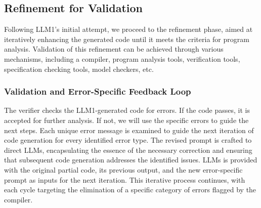 
\subsection{Refinement for Validation}

% 


Following LLM1's initial attempt, we proceed to the refinement phase, aimed at iteratively enhancing the generated code until it meets the criteria for program analysis. Validation of this refinement can be achieved through various mechanisms, including a compiler, program analysis tools, verification tools, specification checking tools, model checkers, etc.


\subsubsection{Validation and Error-Specific Feedback Loop}

The verifier checks the LLM1-generated code for errors. If the code passes, it is accepted for further analysis. If not, we will use the specific errors to guide the next steps.
%
Each unique error message is examined to guide the next iteration of code generation for every identified error type. The revised prompt is crafted to direct LLMs, encapsulating the essence of the necessary correction and ensuring that subsequent code generation addresses the identified issues. LLMs is provided with the original partial code, its previous output, and the new error-specific prompt as inputs for the next iteration. This iterative process continues, with each cycle targeting the elimination of a specific category of errors flagged by the compiler.

